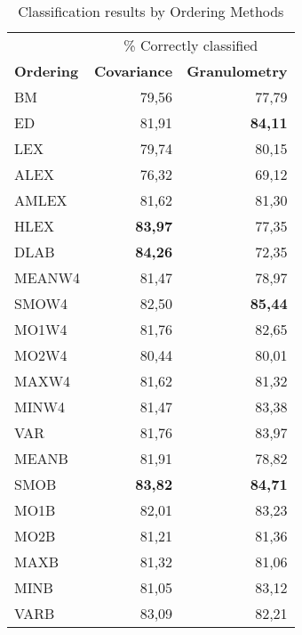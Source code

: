 \begin{table}
\caption{Classification results by Ordering Methods}
\label{tab:experiment1_t1}

\begin{tabular}{@{}lrr@{}}
\toprule
&\multicolumn{2}{c}{ \% 
Correctly classified }\\
\cline{2-3}
\textbf{Ordering} & \textbf{Covariance} &\textbf{Granulometry} \\ 
\cmidrule{1-3}
BM & 79,56 & 77,79 \\ \hline
ED & 81,91 & \textbf{84,11}  \\ \hline
LEX & 79,74 & 80,15 \\ \hline
ALEX & 76,32   &  69,12  \\ \hline
AMLEX &  81,62   &  81,30  \\ \hline
HLEX &  \textbf{83,97}  &  77,35  \\ \hline
DLAB  & \textbf{84,26}  & 72,35   \\ \hline
MEANW4 & 81,47 & 78,97 \\ \hline %
SMOW4 & 82,50 & \textbf{85,44} \\ \hline %
MO1W4 & 81,76 & 82,65 \\ \hline %
MO2W4 & 80,44 & 80,01 \\ \hline %
MAXW4 & 81,62 & 81,32 \\ \hline %
MINW4 & 81,47 & 83,38 \\ \hline %
VAR   & 81,76 &  83,97  \\ \hline 
MEANB & 81,91 & 78,82 \\ \hline %
SMOB & \textbf{83,82} & \textbf{84,71} \\ \hline %
MO1B & 82,01  & 83,23  \\ \hline %
MO2B & 81,21 &  81,36  \\ \hline %
MAXB & 81,32 & 81,06 \\ \hline %
MINB & 81,05 & 83,12 \\ \hline %
VARB & 83,09 &  82,21  \\ \hline 

\end{tabular}
\end{table}

